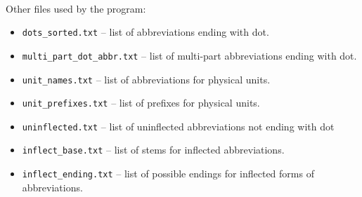 \documentclass[oneside,12pt]{article}
\begin{document}
\paragraph{}
Other files used by the program:
\begin{itemize}
    \item \texttt{dots\_sorted.txt} -- list of abbreviations ending with dot.
    
    \item \texttt{multi\_part\_dot\_abbr.txt} -- list of multi-part abbreviations ending with dot.
    
    \item \texttt{unit\_names.txt} -- list of abbreviations for physical units.
    
    \item \texttt{unit\_prefixes.txt} -- list of prefixes for physical units.
    
    \item \texttt{uninflected.txt} -- list of uninflected abbreviations not ending with dot
    
    \item \texttt{inflect\_base.txt} -- list of stems for inflected abbreviations.
    
    \item \texttt{inflect\_ending.txt} -- list of possible endings for inflected forms of abbreviations.
\end{itemize}
\end{document}
